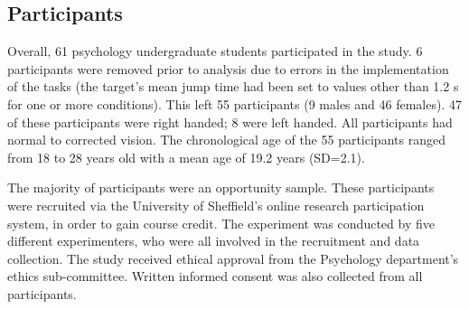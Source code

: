 \documentclass[10pt,letterpaper]{article}
\begin{document}
\subsection*{Participants}
Overall, 61 psychology undergraduate students participated in the
study. 6 participants were removed prior to analysis due to errors in
the implementation of the tasks (the target's mean jump time had been
set to values other than 1.2 s for one or more conditions). This left
55 participants (9 males and 46 females). 47 of these participants
were right handed; 8 were left handed. All participants
had normal to corrected vision. The chronological age of the 55
participants ranged from 18 to 28 years old with a mean age of 19.2
years (SD=2.1).

The majority of participants were an opportunity sample. These
participants were recruited via the University of Sheffield's online
research participation system, in order to gain course credit.  The
experiment was conducted by five different experimenters, who were all
involved in the recruitment and data collection. The study received
ethical approval from the Psychology department's ethics
sub-committee. Written informed consent was also collected from all
participants.
\end{document}
